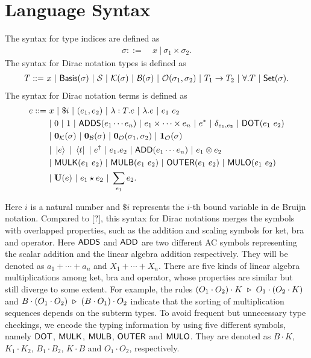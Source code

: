 \documentclass{article}
\begin{document}

\section{Language Syntax}
\begin{definition}[syntax]
    The syntax for type indices are defined as
    \begin{align*}
        \sigma ::=\ & x\ |\ \sigma_1 \times \sigma_2.
    \end{align*}
    The syntax for Dirac notation types is defined as 
    \begin{align*}
        T ::=\ & x\ |\ \Basis(\sigma)\ |\ \SType\ |\ \KType(\sigma)\ |\ \BType(\sigma)\ |\ \OType(\sigma_1, \sigma_2)\ |\ T_1 \to T_2\ |\ \forall .T\ |\ \SET(\sigma). \\
    \end{align*}
    The syntax for Dirac notation terms is defined as
    \begin{align*}
        e ::=\ & x\ |\ \$i\ |\ (e_1, e_2)\ |\ \lambda : T.e\ |\ \lambda.e\ |\ e_1\ e_2 \\
        & |\ 0\ |\ 1\ |\ \ADDS(e_1 \cdots e_n) \ |\ e_1 \times \cdots \times e_n\ |\ e^* \ |\ \delta_{e_1, e_2}\ |\ \DOT(e_1\ e_2) \\
        & |\ \ZEROK(\sigma)\ |\ \ZEROB(\sigma)\ |\ \ZEROO(\sigma_1, \sigma_2)\ |\ \ONEO(\sigma) \\
        & |\ \ket{e}\ |\ \bra{t}\ |\ e^\dagger\ |\ e_1.e_2\ |\ \ADD(e_1 \cdots e_n)\ |\ e_1 \otimes e_2 \\
        & |\ \MULK(e_1\ e_2)\ |\ \MULB(e_1\ e_2)\ |\ \OUTER(e_1\ e_2)\ |\ \MULO(e_1\ e_2) \\
        & |\ \mathbf{U}(e)\ |\ e_1 \star e_2\ |\ \sum_{e_1} e_2.
    \end{align*}
\end{definition}
Here $i$ is a natural number and $\$i$ represents the $i$-th bound variable in de Bruijn notation. 
Compared to [?], this syntax for Dirac notations merges the symbols with overlapped properties, such as the addition and scaling symbols for ket, bra and operator.
Here $\mathsf{ADDS}$ and $\mathsf{ADD}$ are two different AC symbols representing the scalar addition and the linear algebra addition respectively. They will be denoted as $a_1 + \cdots + a_n$ and $X_1 + \cdots + X_n$.
There are five kinds of linear algebra multiplications among ket, bra and operator, whose properties are similar but still diverge to some extent. For example, the rules $(O_1 \cdot O_2) \cdot K\ \triangleright\ O_1 \cdot (O_2 \cdot K)$ and $B \cdot (O_1 \cdot O_2) \ \triangleright\ (B \cdot O_1) \cdot O_2$ indicate that the sorting of multiplication sequences depends on the subterm types. To avoid frequent but unnecessary type checkings, we encode the typing information by using five different symbols, namely $\mathsf{DOT}$, $\mathsf{MULK}$, $\mathsf{MULB}$, $\mathsf{OUTER}$ and $\mathsf{MULO}$. They are denoted as $B\cdot K$, $K_1 \cdot K_2$, $B_1 \cdot B_2$, $K \cdot B$ and $O_1 \cdot O_2$, respectively.
\end{document}
